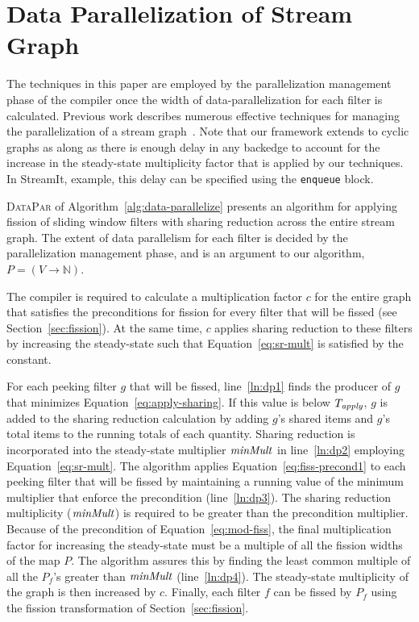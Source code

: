 \section{Data Parallelization of Stream Graph}
\label{sec:data-par}

The techniques in this paper are employed by the parallelization
management phase of the compiler once the width of
data-parallelization for each filter is calculated.  Previous work
describes numerous effective techniques for managing the
parallelization of a stream
graph~\cite{kudlur08,gordon-asplos06,flextream,udupa09-gpu,liao06brook}.
Note that our framework extends to cyclic graphs as along as there is
enough delay in any backedge to account for the increase in the
steady-state multiplicity factor that is applied by our techniques.
In StreamIt, example, this delay can be specified using the
{\tt enqueue} block.

\textsc{DataPar} of Algorithm~\ref{alg:data-parallelize} presents an
algorithm for applying fission of sliding window filters with sharing
reduction across the entire stream graph.  The extent of data
parallelism for each filter is decided by the parallelization
management phase, and is an argument to our algorithm, $P=(V
\rightarrow \mathbb{N})$. 

The compiler is required to calculate a multiplication factor $c$ for
the entire graph that satisfies the preconditions for fission for
every filter that will be fissed (see Section~\ref{sec:fission}).  At
the same time, $c$ applies sharing reduction to these filters by
increasing the steady-state such that Equation~\ref{eq:sr-mult} is
satisfied by the constant.

For each peeking filter $g$ that will be fissed, line~\ref{ln:dp1}
finds the producer of $g$ that minimizes
Equation~\ref{eq:apply-sharing}.  If this value is below
$T_{\relax{\it apply}}$, $g$ is added to the sharing reduction calculation by
adding $g$'s shared items and $g$'s total items to the running totals
of each quantity.  Sharing reduction is incorporated into the
steady-state multiplier $\relax{\it minMult}$ in line~\ref{ln:dp2} employing
Equation~\ref{eq:sr-mult}.  The algorithm applies
Equation~\ref{eq:fiss-precond1} to each peeking filter that will be
fissed by maintaining a running value of the minimum multiplier that
enforce the precondition (line~\ref{ln:dp3}).  The sharing reduction
multiplicity ($\relax{\it minMult}$) is required to be greater than the
precondition multiplier.  Because of the precondition of
Equation~\ref{eq:mod-fiss}, the final multiplication factor for
increasing the steady-state must be a multiple of all the fission
widths of the map $P$. The algorithm assures this by finding the least
common multiple of all the $P_f$'s greater than $\relax{\it minMult}$
(line~\ref{ln:dp4}).  The steady-state multiplicity of the graph is
then increased by $c$.  Finally, each filter $f$ can be fissed by $P_f$
using the fission transformation of Section~\ref{sec:fission}.

